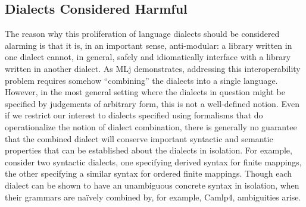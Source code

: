 \subsection{Dialects Considered Harmful}
The reason why this proliferation of language dialects should be considered alarming is that it is, in an important sense, anti-modular: a library written in one dialect cannot, in general, safely and idiomatically interface with a library written in another dialect. %
As MLj demonstrates, addressing this interoperability problem requires somehow ``combining'' the  dialects into a single language. However, in the most general setting where the dialects in question might be specified by judgements of arbitrary form, this is not a well-defined notion. Even if we restrict our interest to dialects specified using formalisms that do operationalize the notion of dialect combination, there is generally no guarantee that the combined dialect will conserve important syntactic and semantic properties that can be established about the dialects in isolation. %
For example, consider two syntactic dialects, one specifying derived syntax for finite mappings, the other specifying a similar syntax for ordered finite mappings. Though each dialect can be shown to have an unambiguous concrete syntax in isolation, when their grammars are na\"ively  combined by, for example, Camlp4,  ambiguities  arise.  %
